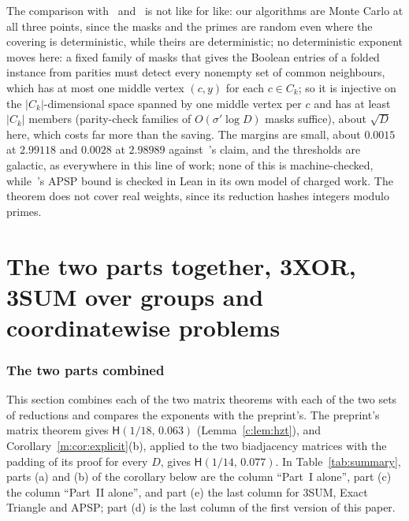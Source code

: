 \documentclass[11pt]{article}
\theoremstyle{definition}
\theoremstyle{remark}
\newcommand{\Hyp}{\mathsf{H}}
\newcommand{\APSPmcOurs}{2.98989}%
\newcommand{\APSPmcDetCov}{2.99118}%
\newcommand{\APSPmarginDet}{0.0015}%
\newcommand{\APSPmarginSplit}{0.0028}%
\begin{document}
The comparison with~\cite{Shr26} and~\cite{EZ26} is not like for like: our algorithms are Monte Carlo at all three points, since the masks and the primes are random even where the covering is deterministic, while theirs are deterministic; no deterministic exponent moves here: a fixed family of masks that gives the Boolean entries of a folded instance from parities must detect every nonempty set of common neighbours, which has at most one middle vertex $(c,y)$ for each $c\in C_k$; so it is injective on the $|C_k|$-dimensional space spanned by one middle vertex per $c$ and has at least $|C_k|$ members (parity-check families of $O(\sigma'\log D)$ masks suffice), about $\sqrt D$ here, which costs far more than the saving.
The margins are small, about $\APSPmarginDet$ at $\APSPmcDetCov$ and $\APSPmarginSplit$ at $\APSPmcOurs$ against~\cite{EZ26}'s claim, and the thresholds are galactic, as everywhere in this line of work; none of this is machine-checked, while~\cite{Shr26}'s APSP bound is checked in Lean in its own model of charged work. The theorem does not cover real weights, since its reduction hashes integers modulo primes.

\FloatBarrier
\part*{The two parts together, 3XOR, 3SUM over groups and coordinatewise problems}

\section{The two parts combined}\label{x:sec:consequences}

This section combines each of the two matrix theorems with each of the two sets of reductions and compares the exponents with the preprint's. The preprint's matrix theorem gives $\Hyp(1/18,\,0.063)$ (Lemma~\ref{c:lem:hzt}), and Corollary~\ref{m:cor:explicit}(b), applied to the two biadjacency matrices with the padding of its proof for every $D$, gives $\Hyp(1/14,\,0.077)$. In Table~\ref{tab:summary}, parts (a) and (b) of the corollary below are the column ``Part~I alone'', part (c) the column ``Part~II alone'', and part (e) the last column for 3SUM, Exact Triangle and APSP; part (d) is the last column of the first version of this paper.
\end{document}
